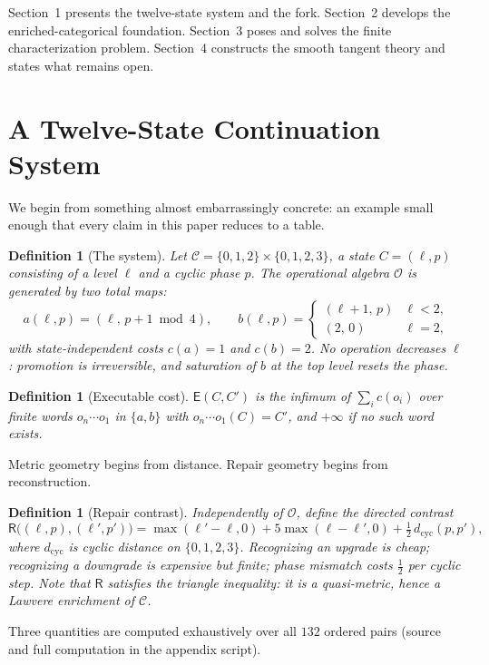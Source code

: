 \documentclass[11pt]{article}
\newtheorem{definition}[theorem]{Definition}
\theoremstyle{remark}
\newcommand{\C}{\mathcal{C}}
\newcommand{\Ops}{\mathcal{O}}
\newcommand{\R}{\mathsf{R}}
\newcommand{\E}{\mathsf{E}}
\begin{document}
Section~1 presents the twelve-state system and the fork. Section~2
develops the enriched-categorical foundation. Section~3 poses and
solves the finite characterization problem. Section~4 constructs the
smooth tangent theory and states what remains open.

\section{A Twelve-State Continuation System}

We begin from something almost embarrassingly concrete: an example
small enough that every claim in this paper reduces to a table.

\begin{definition}[The system]
Let $\C = \{0,1,2\}\times\{0,1,2,3\}$, a state $C=(\ell,p)$ consisting
of a \emph{level} $\ell$ and a cyclic \emph{phase} $p$. The
operational algebra $\Ops$ is generated by two total maps:
\[
a(\ell,p) = (\ell,\, p+1 \bmod 4), \qquad
b(\ell,p) =
\begin{cases}
(\ell+1,\,p) & \ell < 2,\\
(2,\,0) & \ell = 2,
\end{cases}
\]
with state-independent costs $c(a)=1$ and $c(b)=2$. No operation
decreases $\ell$: promotion is irreversible, and saturation of $b$ at
the top level resets the phase.
\end{definition}

\begin{definition}[Executable cost]
$\E(C,C')$ is the infimum of $\sum_i c(o_i)$ over finite words
$o_n\cdots o_1$ in $\{a,b\}$ with $o_n\cdots o_1(C)=C'$, and $+\infty$
if no such word exists.
\end{definition}

Metric geometry begins from distance. Repair geometry begins from
reconstruction.

\begin{definition}[Repair contrast]
Independently of $\Ops$, define the directed contrast
\[
\R\bigl((\ell,p),(\ell',p')\bigr)
= \max(\ell'-\ell,0) + 5\max(\ell-\ell',0)
+ \tfrac12\, d_{\mathrm{cyc}}(p,p'),
\]
where $d_{\mathrm{cyc}}$ is cyclic distance on $\{0,1,2,3\}$.
Recognizing an upgrade is cheap; recognizing a downgrade is expensive
but finite; phase mismatch costs $\tfrac12$ per cyclic step. Note that
$\R$ satisfies the triangle inequality: it is a quasi-metric, hence a
Lawvere enrichment of $\C$.
\end{definition}

Three quantities are computed exhaustively over all $132$ ordered
pairs (source and full computation in the appendix script).
\end{document}
